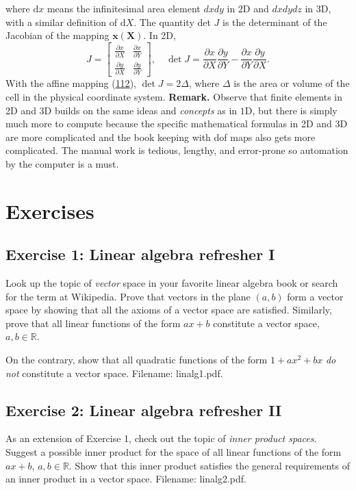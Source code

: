 \documentclass[../main.tex]{subfiles}
\begin{document}
\noindent where $\mathrm{d} x$ means the infinitesimal area element $d x d y$ in $2 \mathrm{D}$ and $d x d y d z$ in 3D, with a similar definition of $\mathrm{d} X$. The quantity det $J$ is the determinant of the Jacobian of the mapping $\boldsymbol{x}(\boldsymbol{X})$. In 2D,
\begin{equation}\label{eqa116}
	J=\left[\begin{array}{ll}
		\frac{\partial x}{\partial X} & \frac{\partial x}{\partial Y} \\
		\frac{\partial y}{\partial X} & \frac{\partial y}{\partial Y}
	\end{array}\right], \quad \operatorname{det} J=\frac{\partial x}{\partial X} \frac{\partial y}{\partial Y}-\frac{\partial x}{\partial Y} \frac{\partial y}{\partial X} .
\end{equation}
With the affine mapping (\hyperref[eqa112]{112}), $\operatorname{det} J=2 \Delta$, where $\Delta$ is the area or volume of the cell in the physical coordinate system.
\bigbreak
\noindent \textbf{Remark.} Observe that finite elements in 2D and 3D builds on the same ideas and \textit{concepts} as in $1 \mathrm{D}$, but there is simply much more to compute because the specific mathematical formulas in 2D and $3 \mathrm{D}$ are more complicated and the book keeping with dof maps also gets more complicated. The manual work is tedious, lengthy, and error-prone so automation by the computer is a must.
\chapter{Exercises}
\label{chap:chap_10}

\section*{Exercise 1: Linear algebra refresher I}
\label{sec:sec_10_1}
\noindent Look up the topic of \textit{vector} space in your favorite linear algebra book or search for the term at Wikipedia. Prove that vectors in the plane $(a, b)$ form a vector space by showing that all the axioms of a vector space are satisfied. Similarly, prove that all linear functions of the form $a x+b$ constitute a vector space, $a, b \in \mathbb{R}$.

On the contrary, show that all quadratic functions of the form $1+a x^{2}+b x$ \textit{do not} constitute a vector space. Filename: linalg1.pdf.
\bigbreak
\section*{Exercise 2: Linear algebra refresher II}
\label{sec:sec_10_2}
\noindent As an extension of Exercise 1, check out the topic of \textit{inner product spaces}. Suggest a possible inner product for the space of all linear functions of the form $a x+b$, $a, b \in \mathbb{R}$. Show that this inner product satisfies the general requirements of an inner product in a vector space. Filename: linalg2.pdf.
\bigbreak
\end{document}

